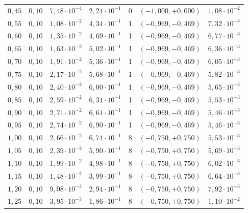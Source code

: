 \begin{tabular}{ccccccc}
$0{,}45$ & $0{,}10$ & $7{,}48 \cdot 10^{-4}$ & $2{,}21 \cdot 10^{-1}$ & 0 & $(-1{,}000, +0{,}000)$ & $1{,}08 \cdot 10^{-2}$ \\
$0{,}55$ & $0{,}10$ & $1{,}08 \cdot 10^{-2}$ & $4{,}34 \cdot 10^{-1}$ & 1 & $(-0{,}969, -0{,}469)$ & $7{,}32 \cdot 10^{-3}$ \\
$0{,}60$ & $0{,}10$ & $1{,}35 \cdot 10^{-2}$ & $4{,}69 \cdot 10^{-1}$ & 1 & $(-0{,}969, -0{,}469)$ & $6{,}77 \cdot 10^{-3}$ \\
$0{,}65$ & $0{,}10$ & $1{,}63 \cdot 10^{-2}$ & $5{,}02 \cdot 10^{-1}$ & 1 & $(-0{,}969, -0{,}469)$ & $6{,}36 \cdot 10^{-3}$ \\
$0{,}70$ & $0{,}10$ & $1{,}91 \cdot 10^{-2}$ & $5{,}36 \cdot 10^{-1}$ & 1 & $(-0{,}969, -0{,}469)$ & $6{,}05 \cdot 10^{-3}$ \\
$0{,}75$ & $0{,}10$ & $2{,}17 \cdot 10^{-2}$ & $5{,}68 \cdot 10^{-1}$ & 1 & $(-0{,}969, -0{,}469)$ & $5{,}82 \cdot 10^{-3}$ \\
$0{,}80$ & $0{,}10$ & $2{,}40 \cdot 10^{-2}$ & $6{,}00 \cdot 10^{-1}$ & 1 & $(-0{,}969, -0{,}469)$ & $5{,}65 \cdot 10^{-3}$ \\
$0{,}85$ & $0{,}10$ & $2{,}59 \cdot 10^{-2}$ & $6{,}31 \cdot 10^{-1}$ & 1 & $(-0{,}969, -0{,}469)$ & $5{,}53 \cdot 10^{-3}$ \\
$0{,}90$ & $0{,}10$ & $2{,}71 \cdot 10^{-2}$ & $6{,}61 \cdot 10^{-1}$ & 1 & $(-0{,}969, -0{,}469)$ & $5{,}46 \cdot 10^{-3}$ \\
$0{,}95$ & $0{,}10$ & $2{,}74 \cdot 10^{-2}$ & $6{,}90 \cdot 10^{-1}$ & 1 & $(-0{,}969, -0{,}469)$ & $5{,}46 \cdot 10^{-3}$ \\
$1{,}00$ & $0{,}10$ & $2{,}66 \cdot 10^{-2}$ & $6{,}74 \cdot 10^{-1}$ & 8 & $(-0{,}750, +0{,}750)$ & $5{,}53 \cdot 10^{-3}$ \\
$1{,}05$ & $0{,}10$ & $2{,}39 \cdot 10^{-2}$ & $5{,}90 \cdot 10^{-1}$ & 8 & $(-0{,}750, +0{,}750)$ & $5{,}69 \cdot 10^{-3}$ \\
$1{,}10$ & $0{,}10$ & $1{,}99 \cdot 10^{-2}$ & $4{,}98 \cdot 10^{-1}$ & 8 & $(-0{,}750, +0{,}750)$ & $6{,}02 \cdot 10^{-3}$ \\
$1{,}15$ & $0{,}10$ & $1{,}48 \cdot 10^{-2}$ & $3{,}99 \cdot 10^{-1}$ & 8 & $(-0{,}750, +0{,}750)$ & $6{,}64 \cdot 10^{-3}$ \\
$1{,}20$ & $0{,}10$ & $9{,}08 \cdot 10^{-3}$ & $2{,}94 \cdot 10^{-1}$ & 8 & $(-0{,}750, +0{,}750)$ & $7{,}92 \cdot 10^{-3}$ \\
$1{,}25$ & $0{,}10$ & $3{,}95 \cdot 10^{-3}$ & $1{,}86 \cdot 10^{-1}$ & 8 & $(-0{,}750, +0{,}750)$ & $1{,}10 \cdot 10^{-2}$ \\

\end{tabular}
